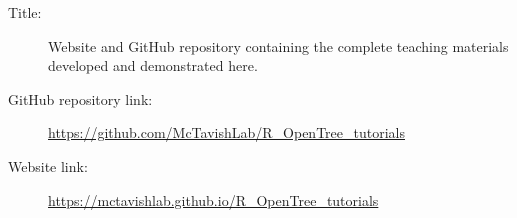 \documentclass[12pt]{article}
\begin{document}
\begin{description}

\item[Title:] Website and GitHub repository containing the complete teaching materials developed and demonstrated here.

\item[GitHub repository link:] \url{https://github.com/McTavishLab/R_OpenTree_tutorials}

\item[Website link:] \url{https://mctavishlab.github.io/R_OpenTree_tutorials}

\end{description}


\end{document}
